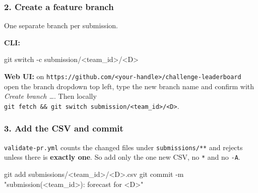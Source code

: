 \documentclass[
  english,
  letterpaper,
]{scrbook}
\newenvironment{Shaded}{\begin{snugshade}}{\end{snugshade}}
\newcommand{\AttributeTok}[1]{\textcolor[rgb]{0.40,0.45,0.13}{#1}}
\newcommand{\FunctionTok}[1]{\textcolor[rgb]{0.28,0.35,0.67}{#1}}
\newcommand{\NormalTok}[1]{\textcolor[rgb]{0.00,0.23,0.31}{#1}}
\newcommand{\OperatorTok}[1]{\textcolor[rgb]{0.37,0.37,0.37}{#1}}
\newcommand{\StringTok}[1]{\textcolor[rgb]{0.13,0.47,0.30}{#1}}
\begin{document}
\subsubsection{2. Create a feature
branch}\label{create-a-feature-branch}

One separate branch per submission.

\textbf{CLI:}

\begin{Shaded}
\begin{Highlighting}[]
\FunctionTok{git}\NormalTok{ switch }\AttributeTok{{-}c}\NormalTok{ submission/}\OperatorTok{\textless{}}\NormalTok{team\_id}\OperatorTok{\textgreater{}}\NormalTok{/}\OperatorTok{\textless{}}\NormalTok{D}\OperatorTok{\textgreater{}}
\end{Highlighting}
\end{Shaded}

\textbf{Web UI:} on
\texttt{https://github.com/\textless{}your-handle\textgreater{}/challenge-leaderboard}
open the branch dropdown top left, type the new branch name and confirm
with \emph{Create branch \ldots{}}. Then locally
\texttt{git\ fetch\ \&\&\ git\ switch\ submission/\textless{}team\_id\textgreater{}/\textless{}D\textgreater{}}.

\subsubsection{3. Add the CSV and commit}\label{add-the-csv-and-commit}

\begin{tcolorbox}[enhanced jigsaw, arc=.35mm, bottomrule=.15mm, bottomtitle=1mm, breakable, colback=white, colbacktitle=quarto-callout-warning-color!10!white, colframe=quarto-callout-warning-color-frame, coltitle=black, left=2mm, leftrule=.75mm, opacityback=0, opacitybacktitle=0.6, rightrule=.15mm, title=\textcolor{quarto-callout-warning-color}{\faExclamationTriangle}\hspace{0.5em}{Exactly one file per PR}, titlerule=0mm, toprule=.15mm, toptitle=1mm]

\texttt{validate-pr.yml} counts the changed files under
\texttt{submissions/**} and rejects unless there is \textbf{exactly
one}. So add only the one new CSV, no \texttt{*} and no \texttt{-A}.

\end{tcolorbox}

\begin{Shaded}
\begin{Highlighting}[]
\FunctionTok{git}\NormalTok{ add submissions/}\OperatorTok{\textless{}}\NormalTok{team\_id}\OperatorTok{\textgreater{}}\NormalTok{/}\OperatorTok{\textless{}}\NormalTok{D}\OperatorTok{\textgreater{}}\NormalTok{.csv}
\FunctionTok{git}\NormalTok{ commit }\AttributeTok{{-}m} \StringTok{"submission(\textless{}team\_id\textgreater{}): forecast for \textless{}D\textgreater{}"}
\end{Highlighting}
\end{Shaded}
\end{document}
